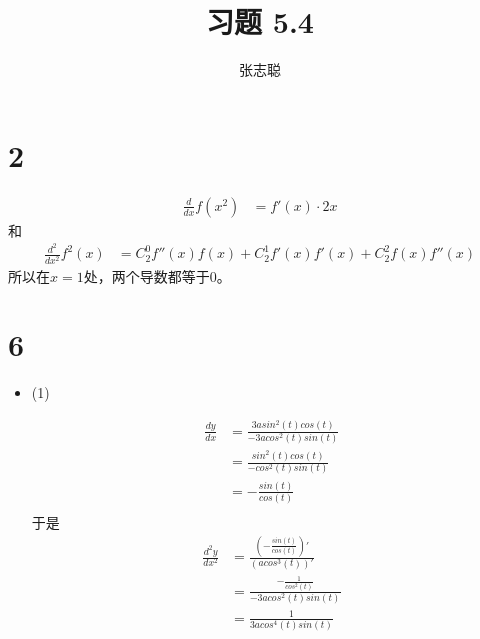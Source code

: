 \documentclass{article}
\begin{document}
\title{习题 5.4}
\author{张志聪}
\maketitle

\section*{2}

\begin{align*}
  \frac{d}{dx} f(x^2)
   & = f'(x) \cdot 2x
\end{align*}
和
\begin{align*}
  \frac{d^2}{dx^2} f^2(x)
   & = C_2^0 f''(x)f(x) + C_2^1 f'(x)f'(x) + C_2^2 f(x) f''(x)
\end{align*}
所以在$x=1$处，两个导数都等于$0$。

\section*{6}

\begin{itemize}
  \item (1)

        \begin{align*}
          \frac{dy}{dx}
           & = \frac{3a sin^2(t) cos(t)}{-3acos^2(t)sin(t)} \\
           & = \frac{sin^2(t) cos(t)}{-cos^2(t)sin(t)}      \\
           & = - \frac{sin(t)}{cos(t)}                      \\
        \end{align*}
        于是
        \begin{align*}
          \frac{d^2y}{dx^2} 
          & = \frac{\left(- \frac{sin(t)}{cos(t)}\right)'}{\left(acos^3(t)\right)'} \\
          & = \frac{-\frac{1}{cos^2(t)}}{-3acos^2(t)sin(t)} \\
          & = \frac{1}{3acos^4(t)sin(t)}
        \end{align*}

\end{itemize}
\end{document}

